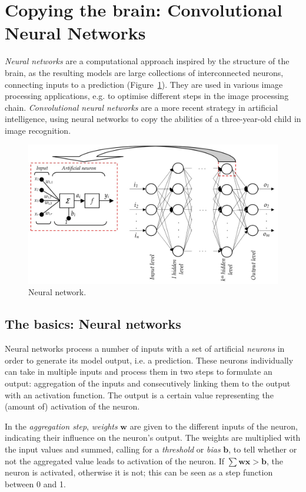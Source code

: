\section{Copying the brain: Convolutional Neural Networks \label{sec:cnn}}
\textit{Neural networks} are a computational approach inspired by the structure of the brain, as the resulting models are large collections of interconnected neurons, connecting inputs to a prediction (Figure~\ref{fig:ann}). They are used in various image processing applications, e.g. to optimise different steps in the image processing chain. \textit{Convolutional neural networks} are a more recent strategy in artificial intelligence, using neural networks to copy the abilities of a three-year-old child in image recognition.
\begin{figure}[h!]
	\centering
	\includegraphics[width=\textwidth]{../figures/ann_struct}
	\caption{Neural network.
		\label{fig:ann}}
\end{figure}

\subsection{The basics: Neural networks \label{subsec:neural}}
Neural networks process a number of inputs with a set of artificial \textit{neurons} in order to generate its model output, i.e. a prediction. These neurons individually can take in multiple inputs and process them in two steps to formulate an output: aggregation of the inputs and consecutively linking them to the output with an activation function. The output is a certain value representing the (amount of) activation of the neuron. 


In the \textit{aggregation step}, \textit{weights} $\textbf{w}$ are given to the different inputs of the neuron, indicating their influence on the neuron\textquoteright s output. The weights are multiplied with the input values and summed, calling for a \textit{threshold} or \textit{bias} $\textbf{b}$, to tell whether or not the aggregated value leads to activation of the neuron. If $\sum{\textbf{wx}} > \textbf{b}$, the neuron is activated, otherwise it is not; this can be seen as a step function between 0 and 1.


